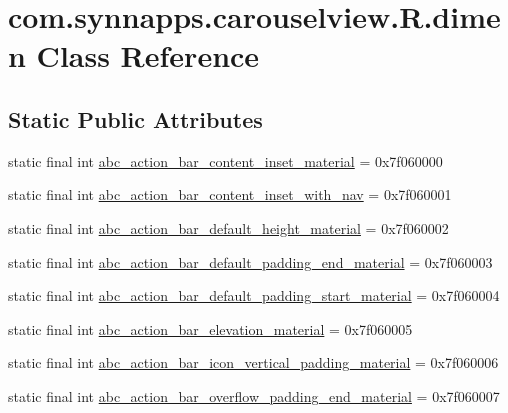 \hypertarget{classcom_1_1synnapps_1_1carouselview_1_1_r_1_1dimen}{}\section{com.\+synnapps.\+carouselview.\+R.\+dimen Class Reference}
\label{classcom_1_1synnapps_1_1carouselview_1_1_r_1_1dimen}
\subsection*{Static Public Attributes}
\begin{DoxyCompactItemize}
\item 
static final int \mbox{\hyperlink{classcom_1_1synnapps_1_1carouselview_1_1_r_1_1dimen_a16a0484f7628fe479c4182920a23d00f}{abc\+\_\+action\+\_\+bar\+\_\+content\+\_\+inset\+\_\+material}} = 0x7f060000
\item 
static final int \mbox{\hyperlink{classcom_1_1synnapps_1_1carouselview_1_1_r_1_1dimen_aa23457cd3711401fb5fd18b90cd07720}{abc\+\_\+action\+\_\+bar\+\_\+content\+\_\+inset\+\_\+with\+\_\+nav}} = 0x7f060001
\item 
static final int \mbox{\hyperlink{classcom_1_1synnapps_1_1carouselview_1_1_r_1_1dimen_a587ed7838157d2864e8cc471856aba40}{abc\+\_\+action\+\_\+bar\+\_\+default\+\_\+height\+\_\+material}} = 0x7f060002
\item 
static final int \mbox{\hyperlink{classcom_1_1synnapps_1_1carouselview_1_1_r_1_1dimen_a8a85b9491195092ded1caaf93707d317}{abc\+\_\+action\+\_\+bar\+\_\+default\+\_\+padding\+\_\+end\+\_\+material}} = 0x7f060003
\item 
static final int \mbox{\hyperlink{classcom_1_1synnapps_1_1carouselview_1_1_r_1_1dimen_aa399b65dacb1ec4e534750e11f8a9bec}{abc\+\_\+action\+\_\+bar\+\_\+default\+\_\+padding\+\_\+start\+\_\+material}} = 0x7f060004
\item 
static final int \mbox{\hyperlink{classcom_1_1synnapps_1_1carouselview_1_1_r_1_1dimen_a3f8881d24ae30d9a73d0859c62aac1a5}{abc\+\_\+action\+\_\+bar\+\_\+elevation\+\_\+material}} = 0x7f060005
\item 
static final int \mbox{\hyperlink{classcom_1_1synnapps_1_1carouselview_1_1_r_1_1dimen_a0c6ace10d02a9455bfd6d7ee0916a4e9}{abc\+\_\+action\+\_\+bar\+\_\+icon\+\_\+vertical\+\_\+padding\+\_\+material}} = 0x7f060006
\item 
static final int \mbox{\hyperlink{classcom_1_1synnapps_1_1carouselview_1_1_r_1_1dimen_aef7083bda1c44425012320d1b65342c5}{abc\+\_\+action\+\_\+bar\+\_\+overflow\+\_\+padding\+\_\+end\+\_\+material}} = 0x7f060007

\end{DoxyCompactItemize}
